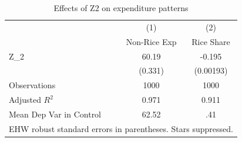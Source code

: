 \begin{table}[htbp]\centering
\caption{Effects of Z2 on expenditure patterns}
\begin{tabular}{l*{2}{c}}
\hline\hline
                    &\multicolumn{1}{c}{(1)}&\multicolumn{1}{c}{(2)}\\
                    &\multicolumn{1}{c}{Non-Rice Exp}&\multicolumn{1}{c}{Rice Share}\\
\hline
Z\_2                 &       60.19&      -0.195\\
                    &     (0.331)&   (0.00193)\\
\hline
Observations        &        1000&        1000\\
Adjusted \(R^{2}\)  &       0.971&       0.911\\
Mean Dep Var in Control&       62.52&         .41\\
\hline\hline
\multicolumn{3}{l}{\footnotesize EHW robust standard errors in parentheses. Stars suppressed.}\\
\end{tabular}
\end{table}
